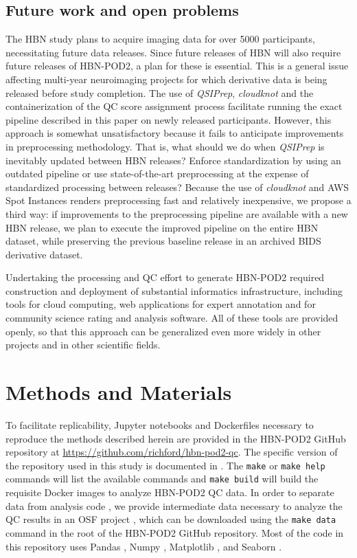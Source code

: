 \documentclass[fleqn,10pt,inline]{wlscirep}
\begin{document}
\subsection*{Future work and open problems}

The HBN study plans to acquire imaging data for over \num{5000} participants,
necessitating future data releases. Since future releases of HBN will also require future releases of HBN-POD2, a plan for these is essential. This is
a general issue affecting multi-year neuroimaging projects for which derivative
data is being released before study completion. The use of \emph{QSIPrep},
\emph{cloudknot} and the containerization of the QC score assignment process
facilitate running the exact pipeline described in this paper on newly released
participants. However, this approach is somewhat unsatisfactory because it fails to
anticipate improvements in preprocessing methodology. That is, what should we do
when \emph{QSIPrep} is inevitably updated between HBN releases? Enforce
standardization by using an outdated pipeline or use state-of-the-art
preprocessing at the expense of standardized processing between releases?
Because the use of \emph{cloudknot} and AWS Spot Instances renders preprocessing
fast and relatively inexpensive, we propose a third way: if improvements to the
preprocessing pipeline are available with a new HBN release, we plan to execute
the improved pipeline on the entire HBN dataset, while preserving the previous
baseline release in an archived BIDS derivative dataset.

Undertaking the processing and QC effort to generate HBN-POD2 required
construction and deployment of substantial informatics infrastructure, including
tools for cloud computing, web applications for expert annotation and for
community science rating and analysis software. All of these tools are provided
openly, so that this approach can be generalized even more widely in other
projects and in other scientific fields.

\section*{Methods and Materials}

To facilitate replicability, Jupyter notebooks \cite{kluyver2016jupyter} and
Dockerfiles \cite{merkel2014docker} necessary to reproduce the methods described
herein are provided in the HBN-POD2 GitHub repository at
\url{https://github.com/richford/hbn-pod2-qc}. The specific version of the
repository used in this study is documented in \cite{richiehalford2022hbnpod2qc}.
The \texttt{make} or \texttt{make help}
commands will list the available commands and \texttt{make build} will build the
requisite Docker images to analyze HBN-POD2 QC data. In order to separate data
from analysis code \cite{Wilson2017-rj}, we provide intermediate data necessary
to analyze the QC results in an OSF \cite{Foster-MSLS2017-rl} project
\cite{hbn-pod2-osf}, which can be downloaded using the \texttt{make data}
command in the root of the HBN-POD2 GitHub repository. Most of the code in this
repository uses Pandas \cite{mckinney-proc-scipy-2010,reback2020pandas}, Numpy
\cite{harris2020array}, Matplotlib \cite{hunter2007matplotlib}, and Seaborn
\cite{waskom2021seaborn}.
\end{document}
